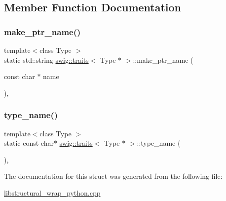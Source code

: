 \subsection{Member Function Documentation}
\mbox{\label{structswig_1_1traits_3_01_type_01_5_01_4_a5251b3fb5f48a5a48f17c25cafe21817}} 
\subsubsection{\texorpdfstring{make\+\_\+ptr\+\_\+name()}{make\_ptr\_name()}}
{\footnotesize\ttfamily template$<$class Type $>$ \\
static std\+::string \hyperlink{structswig_1_1traits}{swig\+::traits}$<$ Type $\ast$ $>$\+::make\+\_\+ptr\+\_\+name (\begin{DoxyParamCaption}\item[{const char $\ast$}]{name }\end{DoxyParamCaption})\hspace{0.3cm}{\ttfamily [inline]}, {\ttfamily [static]}}

\mbox{\label{structswig_1_1traits_3_01_type_01_5_01_4_ac5aae8203a9a4b151f6719e58a0cc252}} 
\subsubsection{\texorpdfstring{type\+\_\+name()}{type\_name()}}
{\footnotesize\ttfamily template$<$class Type $>$ \\
static const char$\ast$ \hyperlink{structswig_1_1traits}{swig\+::traits}$<$ Type $\ast$ $>$\+::type\+\_\+name (\begin{DoxyParamCaption}{ }\end{DoxyParamCaption})\hspace{0.3cm}{\ttfamily [inline]}, {\ttfamily [static]}}



The documentation for this struct was generated from the following file\+:\begin{DoxyCompactItemize}
\item 
\hyperlink{libstructural__wrap__python_8cpp}{libstructural\+\_\+wrap\+\_\+python.\+cpp}\end{DoxyCompactItemize}

